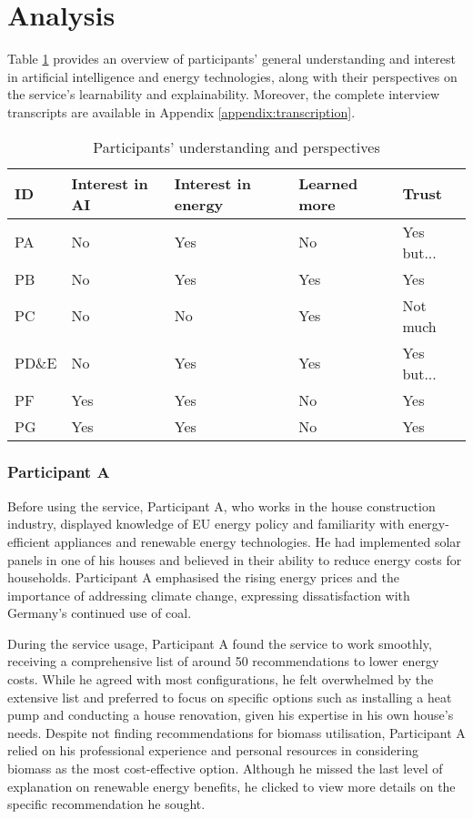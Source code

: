 \section{Analysis}

Table \ref{tab:participants_perceptions} provides an overview of participants' general understanding and interest in artificial intelligence and energy technologies, 
along with their perspectives on the service's learnability and explainability. 
Moreover, the complete interview transcripts are available in Appendix \ref{appendix:transcription}.

\begin{table}[h!]
  \centering
  \begin{tabular}{ | p{} | p{} | p{} | p{} | p{} | } 
    \hline
    ID & Interest in AI & Interest in energy & Learned more & Trust \\
    \hline
    PA & No & Yes & No & Yes but... \\
    \hline
    PB & No & Yes & Yes & Yes \\
    \hline
    PC & No & No & Yes & Not much \\
    \hline
    PD\&E & No & Yes & Yes & Yes but... \\
    \hline
    PF & Yes & Yes & No & Yes \\
    \hline
    PG & Yes & Yes & No & Yes \\
    \hline
  \end{tabular}
  \caption{Participants' understanding and perspectives}
  \label{tab:participants_perceptions}
\end{table}


\subsubsection{Participant A}

Before using the service, 
Participant A, who works in the house construction industry, 
displayed knowledge of EU energy policy and familiarity with energy-efficient appliances and renewable energy technologies. 
He had implemented solar panels in one of his houses and believed in their ability to reduce energy costs for households. 
Participant A emphasised the rising energy prices and the importance of addressing climate change, expressing dissatisfaction with Germany's continued use of coal. 

During the service usage, 
Participant A found the service to work smoothly, receiving a comprehensive list of around 50 recommendations to lower energy costs. 
While he agreed with most configurations, he felt overwhelmed by the extensive list and preferred to focus on specific options such as installing a heat pump and conducting a house renovation, given his expertise in his own house's needs. 
Despite not finding recommendations for biomass utilisation, Participant A relied on his professional experience and personal resources in considering biomass as the most cost-effective option. 
Although he missed the last level of explanation on renewable energy benefits, he clicked to view more details on the specific recommendation he sought.

